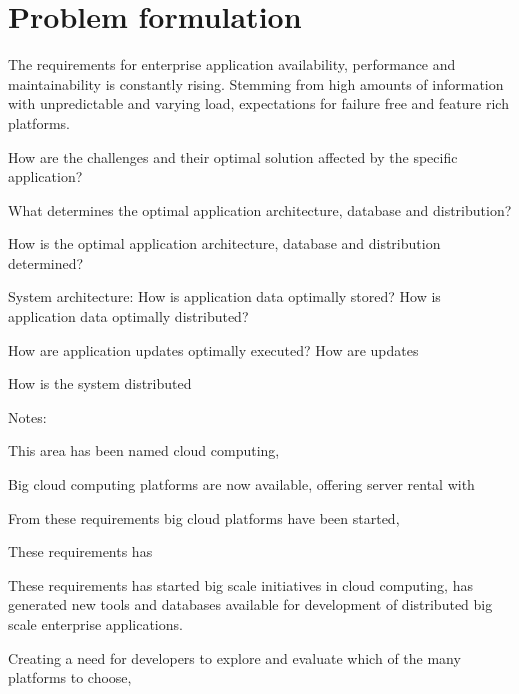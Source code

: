 \section{Problem formulation}
The requirements for enterprise application availability, performance and maintainability is constantly rising. Stemming from high amounts of information with unpredictable and varying load, expectations for failure free and feature rich platforms. 

How are the challenges and their optimal solution affected by the specific application?

What determines the optimal application architecture, database and distribution?

How is the optimal application architecture, database and distribution determined?

System architecture:
How is application data optimally stored?
How is application data optimally distributed?

How are application updates optimally executed?
How are updates 

How is the system distributed

Notes:

This area has been named cloud computing, 

Big cloud computing platforms are now available, offering server rental with 

From these requirements big cloud platforms have been started, 

These requirements has 

These requirements has started big scale initiatives in cloud computing, has generated new tools and databases available for development of distributed big scale enterprise applications. 

Creating a need for developers to explore and evaluate which of the many platforms to choose, 